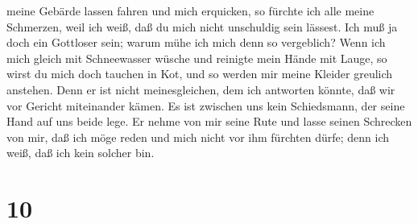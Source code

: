 meine Gebärde lassen fahren und mich erquicken,  so fürchte
ich alle meine Schmerzen, weil ich weiß, daß du mich nicht unschuldig
sein lässest.  Ich muß ja doch ein Gottloser sein; warum
mühe ich mich denn so vergeblich?  Wenn ich mich gleich mit
Schneewasser wüsche und reinigte mein Hände mit Lauge,  so
wirst du mich doch tauchen in Kot, und so werden mir meine Kleider
greulich anstehen.  Denn er ist nicht meinesgleichen, dem
ich antworten könnte, daß wir vor Gericht miteinander kämen.
 Es ist zwischen uns kein Schiedsmann, der seine Hand auf
uns beide lege.  Er nehme von mir seine Rute und lasse
seinen Schrecken von mir,  daß ich möge reden und mich
nicht vor ihm fürchten dürfe; denn ich weiß, daß ich kein solcher bin.

\hypertarget{section-9}{%
\section{10}\label{section-9}}

